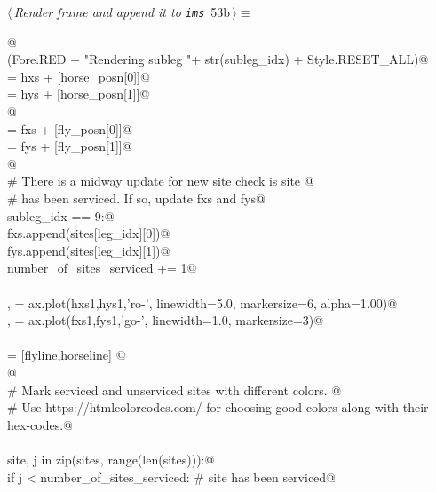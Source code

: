 \documentclass[11.5pt]{report}
\begin{document}
\begin{flushleft} \small\label{scrap86}\raggedright\small
{} $\langle\,${\itshape Render frame and append it to \verb|ims|}\nobreak\ {\footnotesize {53b}}$\,\rangle\equiv$
\vspace{-1ex}
\begin{list}{}{} \item
\mbox{}\verb@   @\\
\mbox{}\verb@debug(Fore.RED + "Rendering subleg "+ str(subleg_idx) + Style.RESET_ALL)@\\
\mbox{} = hxs + [horse_posn[0]]@\\
\mbox{} = hys + [horse_posn[1]]@\\
\mbox{}\verb@               @\\
\mbox{} = fxs + [fly_posn[0]]@\\
\mbox{} = fys + [fly_posn[1]]@\\
\mbox{}\verb@                 @\\
\mbox{}\verb@# There is a midway update for new site check is site @\\
\mbox{}\verb@# has been serviced. If so, update fxs and fys@\\
\mbox{}\verb@if subleg_idx == 9:@\\
\mbox{}\verb@    fxs.append(sites[leg_idx][0])@\\
\mbox{}\verb@    fys.append(sites[leg_idx][1])@\\
\mbox{}\verb@    number_of_sites_serviced += 1@\\
\mbox{}\verb@@\\
\mbox{}\verb@horseline, = ax.plot(hxs1,hys1,'ro-', linewidth=5.0, markersize=6, alpha=1.00)@\\
\mbox{}\verb@flyline,   = ax.plot(fxs1,fys1,'go-', linewidth=1.0, markersize=3)@\\
\mbox{}\verb@@\\
\mbox{}\verb@objs = [flyline,horseline] @\\
\mbox{}\verb@ @\\
\mbox{}\verb@# Mark serviced and unserviced sites with different colors. @\\
\mbox{}\verb@# Use https://htmlcolorcodes.com/ for choosing good colors along with their hex-codes.@\\
\mbox{}\verb@@\\
\mbox{}\verb@for site, j in zip(sites, range(len(sites))):@\\
\mbox{}\verb@    if j < number_of_sites_serviced:       # site has been serviced@\\

\end{list}
\end{flushleft}
\end{document}
